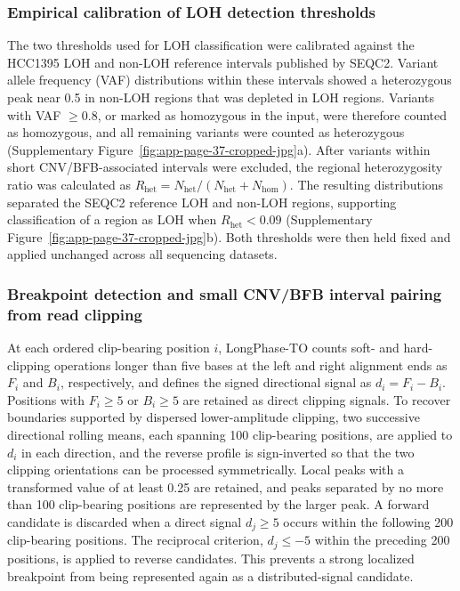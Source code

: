 \documentclass[pdflatex,sn-nature]{sn-jnl}
\begin{document}
\subsubsection{Empirical calibration of LOH detection thresholds}\label{methodology-for-loss-of-heterozygosity-loh-detection}

The two thresholds used for LOH classification were calibrated against the HCC1395 LOH and non-LOH reference intervals published by SEQC2. Variant allele frequency (VAF) distributions within these intervals showed a heterozygous peak near 0.5 in non-LOH regions that was depleted in LOH regions. Variants with VAF $\geq0.8$, or marked as homozygous in the input, were therefore counted as homozygous, and all remaining variants were counted as heterozygous (Supplementary Figure~\ref{fig:app-page-37-cropped-jpg}a). After variants within short CNV/BFB-associated intervals were excluded, the regional heterozygosity ratio was calculated as \(R_{\mathrm{het}}=N_{\mathrm{het}}/(N_{\mathrm{het}}+N_{\mathrm{hom}})\). The resulting distributions separated the SEQC2 reference LOH and non-LOH regions, supporting classification of a region as LOH when \(R_{\mathrm{het}}<0.09\) (Supplementary Figure~\ref{fig:app-page-37-cropped-jpg}b). Both thresholds were then held fixed and applied unchanged across all sequencing datasets.

\subsubsection{Breakpoint detection and small CNV/BFB interval pairing from read clipping}\label{supp:directional-clipping}

At each ordered clip-bearing position \(i\), LongPhase-TO counts soft- and hard-clipping operations longer than five bases at the left and right alignment ends as \(F_i\) and \(B_i\), respectively, and defines the signed directional signal as \(d_i=F_i-B_i\). Positions with \(F_i\geq5\) or \(B_i\geq5\) are retained as direct clipping signals. To recover boundaries supported by dispersed lower-amplitude clipping, two successive directional rolling means, each spanning 100 clip-bearing positions, are applied to \(d_i\) in each direction, and the reverse profile is sign-inverted so that the two clipping orientations can be processed symmetrically. Local peaks with a transformed value of at least 0.25 are retained, and peaks separated by no more than 100 clip-bearing positions are represented by the larger peak. A forward candidate is discarded when a direct signal \(d_j\geq5\) occurs within the following 200 clip-bearing positions. The reciprocal criterion, \(d_j\leq-5\) within the preceding 200 positions, is applied to reverse candidates. This prevents a strong localized breakpoint from being represented again as a distributed-signal candidate.
\end{document}
